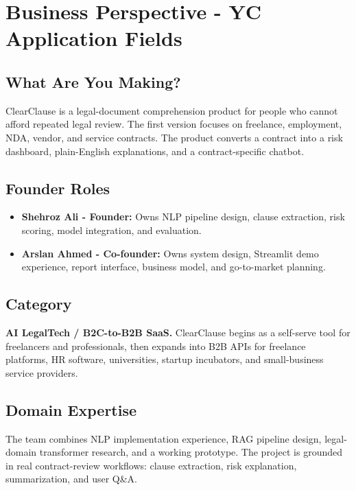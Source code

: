 \documentclass[11pt,a4paper]{article}
\begin{document}
\section{Business Perspective - YC Application Fields}

\subsection{What Are You Making?}

ClearClause is a legal-document comprehension product for people who cannot afford repeated legal review. The first version focuses on freelance, employment, NDA, vendor, and service contracts. The product converts a contract into a risk dashboard, plain-English explanations, and a contract-specific chatbot.

\subsection{Founder Roles}

\begin{itemize}
\item \textbf{Shehroz Ali - Founder:} Owns NLP pipeline design, clause extraction, risk scoring, model integration, and evaluation.
\item \textbf{Arslan Ahmed - Co-founder:} Owns system design, Streamlit demo experience, report interface, business model, and go-to-market planning.
\end{itemize}

\subsection{Category}

\textbf{AI LegalTech / B2C-to-B2B SaaS.} ClearClause begins as a self-serve tool for freelancers and professionals, then expands into B2B APIs for freelance platforms, HR software, universities, startup incubators, and small-business service providers.

\subsection{Domain Expertise}

The team combines NLP implementation experience, RAG pipeline design, legal-domain transformer research, and a working prototype. The project is grounded in real contract-review workflows: clause extraction, risk explanation, summarization, and user Q\&A.
\end{document}
